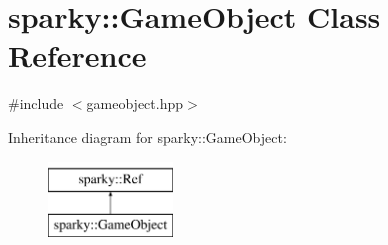 \hypertarget{classsparky_1_1_game_object}{}\section{sparky\+:\+:Game\+Object Class Reference}
\label{classsparky_1_1_game_object}


{\ttfamily \#include $<$gameobject.\+hpp$>$}

Inheritance diagram for sparky\+:\+:Game\+Object\+:\begin{figure}[H]
\begin{center}
\leavevmode
\includegraphics[height=2.000000cm]{classsparky_1_1_game_object}
\end{center}
\end{figure}
